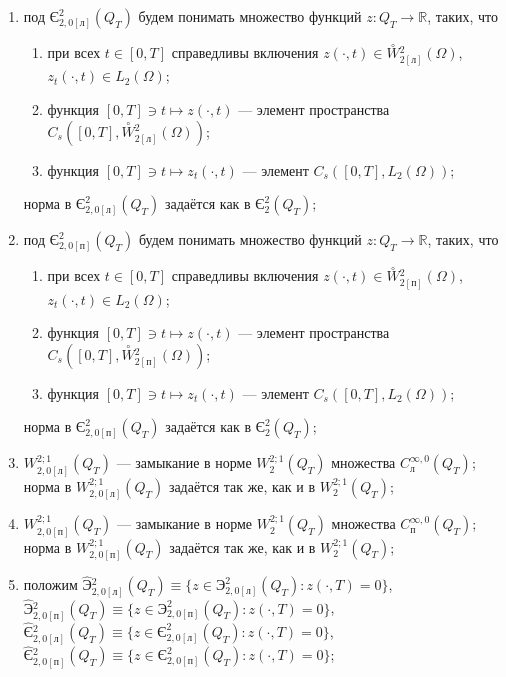 \documentclass{report}
\begin{document}
{\begin{enumerate}
    \item
под $\textrm{Є}^2_{2,0[\textrm{л}]}(Q_T)$ будем понимать множество функций $z:Q_T\to\mathbb{R}$, таких, что
\begin{enumerate}
    \item
при всех $t\in[0,T]$ справедливы включения $z(\cdot,t)\in\stackrel{\circ}{W}\!\!^2_{2[\textrm{л}]}(\Omega)$, $z_t(\cdot,t)\in L_2(\Omega)$;
    \item
функция $[0,T]\ni t\mapsto z(\cdot,t)$ --- элемент пространства $C_s([0,T],\stackrel{\circ}{W}\!\!^2_{2[\textrm{л}]}(\Omega))$;
    \item
функция  $[0,T]\ni t\mapsto z_t(\cdot,t)$ --- элемент $C_s([0,T],L_2(\Omega))$;
\end{enumerate}
норма в  $\textrm{Є}^2_{2,0[\textrm{л}]}(Q_T)$ задаётся как в $\textrm{Є}^2_{2}(Q_T)$;

    \item
под $\textrm{Є}^2_{2,0[\textrm{п}]}(Q_T)$ будем понимать множество функций $z:Q_T\to\mathbb{R}$, таких, что
\begin{enumerate}
    \item
при всех $t\in[0,T]$ справедливы включения $z(\cdot,t)\in\stackrel{\circ}{W}\!\!^2_{2[\textrm{п}]}(\Omega)$, $z_t(\cdot,t)\in L_2(\Omega)$;
    \item
функция $[0,T]\ni t\mapsto z(\cdot,t)$ --- элемент пространства $C_s([0,T],\stackrel{\circ}{W}\!\!^2_{2[\textrm{п}]}(\Omega))$;
    \item
функция  $[0,T]\ni t\mapsto z_t(\cdot,t)$ --- элемент $C_s([0,T],L_2(\Omega))$;
\end{enumerate}
норма в  $\textrm{Є}^2_{2,0[\textrm{п}]}(Q_T)$ задаётся как в $\textrm{Є}^2_{2}(Q_T)$;

    \item
$W^{2;1}_{2,0[\textrm{л}]}(Q_T)$ --- замыкание в норме $W^{2;1}_2(Q_T)$ множества $C^{\infty,0}_{\textrm{л}}(Q_T)$; норма в $W^{2;1}_{2,0[\textrm{л}]}(Q_T)$ задаётся
так же, как и в $W^{2;1}_2(Q_T)$;

    \item
$W^{2;1}_{2,0[\textrm{п}]}(Q_T)$ --- замыкание в норме $W^{2;1}_2(Q_T)$ множества $C^{\infty,0}_{\textrm{п}}(Q_T)$; норма в $W^{2;1}_{2,0[\textrm{п}]}(Q_T)$ задаётся
так же, как и в $W^{2;1}_2(Q_T)$;

    \item
положим $\hat{\textrm{Э}}{}^2_{2,0[\textrm{л}]}(Q_T)\equiv\{z\in \textrm{Э}^2_{2,0[\textrm{л}]}(Q_T):z(\cdot,T)=0\}$,
$\hat{\textrm{Э}}{}^2_{2,0[\textrm{п}]}(Q_T)\equiv\{z\in \textrm{Э}^2_{2,0[\textrm{п}]}(Q_T):z(\cdot,T)=0\}$,
$\hat{\textrm{Є}}{}^2_{2,0[\textrm{л}]}(Q_T)\equiv\{z\in \textrm{Є}^2_{2,0[\textrm{л}]}(Q_T):z(\cdot,T)=0\}$,
$\hat{\textrm{Є}}{}^2_{2,0[\textrm{п}]}(Q_T)\equiv\{z \in \textrm{Є}^2_{2,0[\textrm{п}]}(Q_T):z(\cdot,T)=0\}$;


\end{enumerate}}
\end{document}
